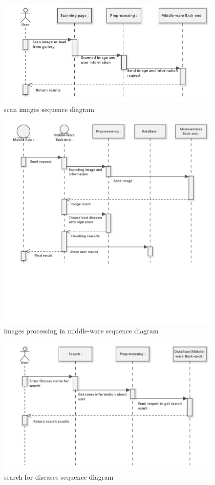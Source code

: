 \begin{figure}
	\centering
	\includegraphics[width = 12cm]{backmatter/figures/Seq/scan.jpg}
	\caption{scan images sequence diagram}
\end{figure}
\begin{figure}
	\centering
	\includegraphics[width = 12cm]{backmatter/figures/Seq/scanback.jpg}
	\caption{images processing in middle-ware sequence diagram}
\end{figure}
\begin{figure}
	\centering
	\includegraphics[width = 12cm]{backmatter/figures/Seq/search.jpg}
	\caption{search for diseases sequence diagram}
\end{figure}
